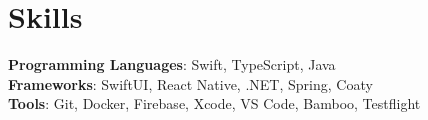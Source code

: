 \documentclass[letterpaper,11pt]{article}
\begin{document}
\section{Skills}
 \begin{itemize}[leftmargin=0.15in, label={}]
    \small{\item{
     \textbf{Programming Languages}{: Swift, TypeScript, Java} \\

     \textbf{Frameworks}{: SwiftUI, React Native, .NET, Spring, Coaty} \\
     \textbf{Tools}{: Git, Docker, Firebase, Xcode, VS Code, Bamboo, Testflight} \\
    }}
 \end{itemize}

\end{document}
